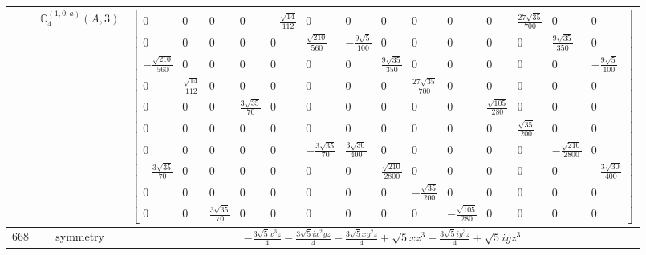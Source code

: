 \documentclass[fleqn,8pt,landscape]{jsarticle}
\begin{document}
\begin{longtable}{ccc}
$  $ & $ \mathbb{G}_{4}^{(1,0;a)}(A,3) $ & $ \begin{bmatrix} 0 & 0 & 0 & 0 & - \frac{\sqrt{14}}{112} & 0 & 0 & 0 & 0 & 0 & 0 & \frac{27 \sqrt{35}}{700} & 0 & 0 \\ 0 & 0 & 0 & 0 & 0 & \frac{\sqrt{210}}{560} & - \frac{9 \sqrt{5}}{100} & 0 & 0 & 0 & 0 & 0 & \frac{9 \sqrt{35}}{350} & 0 \\ - \frac{\sqrt{210}}{560} & 0 & 0 & 0 & 0 & 0 & 0 & \frac{9 \sqrt{35}}{350} & 0 & 0 & 0 & 0 & 0 & - \frac{9 \sqrt{5}}{100} \\ 0 & \frac{\sqrt{14}}{112} & 0 & 0 & 0 & 0 & 0 & 0 & \frac{27 \sqrt{35}}{700} & 0 & 0 & 0 & 0 & 0 \\ 0 & 0 & 0 & \frac{3 \sqrt{35}}{70} & 0 & 0 & 0 & 0 & 0 & 0 & \frac{\sqrt{105}}{280} & 0 & 0 & 0 \\ 0 & 0 & 0 & 0 & 0 & 0 & 0 & 0 & 0 & 0 & 0 & \frac{\sqrt{35}}{200} & 0 & 0 \\ 0 & 0 & 0 & 0 & 0 & - \frac{3 \sqrt{35}}{70} & \frac{3 \sqrt{30}}{400} & 0 & 0 & 0 & 0 & 0 & - \frac{\sqrt{210}}{2800} & 0 \\ - \frac{3 \sqrt{35}}{70} & 0 & 0 & 0 & 0 & 0 & 0 & \frac{\sqrt{210}}{2800} & 0 & 0 & 0 & 0 & 0 & - \frac{3 \sqrt{30}}{400} \\ 0 & 0 & 0 & 0 & 0 & 0 & 0 & 0 & - \frac{\sqrt{35}}{200} & 0 & 0 & 0 & 0 & 0 \\ 0 & 0 & \frac{3 \sqrt{35}}{70} & 0 & 0 & 0 & 0 & 0 & 0 & - \frac{\sqrt{105}}{280} & 0 & 0 & 0 & 0 \end{bmatrix} $ \\ \hline
$ 668 $ & $ \text{symmetry} $ & $ - \frac{3 \sqrt{5} x^{3} z}{4} - \frac{3 \sqrt{5} i x^{2} y z}{4} - \frac{3 \sqrt{5} x y^{2} z}{4} + \sqrt{5} x z^{3} - \frac{3 \sqrt{5} i y^{3} z}{4} + \sqrt{5} i y z^{3} $ \\

\end{longtable}
\end{document}
